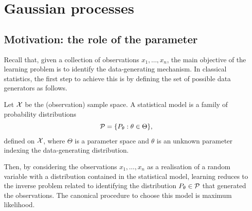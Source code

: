 \chapter{Gaussian processes}



\section{Motivation: the role of the parameter}
\label{sec:ch4_motivation}

Recall that, given a collection of observations $x_1,\ldots,x_n$, the main objective of the learning problem is to identify the data-generating mechanism. In classical statistics, the first step to achieve this is by defining the set of possible data generators as follows.  
\begin{definition}
Let ${\mathcal X}$ be the (observation) sample space.  
A statistical model is a family of probability distributions
\[
{\mathcal P} = \{ P_\theta : \theta \in \Theta \},
\]
defined on ${\mathcal X}$, where $\Theta$ is a parameter space and $\theta$ is an unknown parameter indexing the data-generating distribution.
\end{definition}

Then, by considering the observations $x_1,\ldots,x_n$ as a realisation of a random variable with a distribution contained in the statistical model, learning reduces to the inverse problem related to identifying the distribution $P_\theta\in{\mathcal P}$ that generated the observations. The canonical procedure to choose this model is maximum likelihood. 


